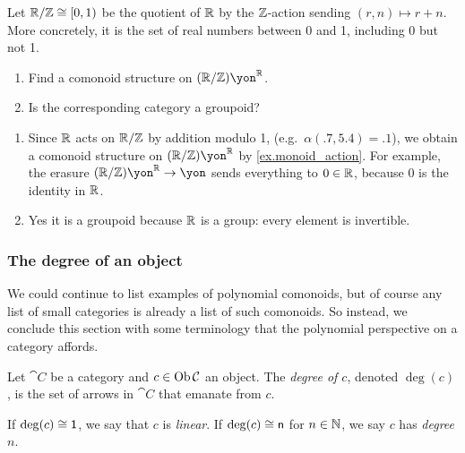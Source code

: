 \documentclass[Book-Poly]{subfiles}
\begin{document}
\begin{exercise}
Let $\mathbb{R}/\mathbb{Z}\cong[0,1)$ be the quotient of $\mathbb{R}$ by the $\mathbb{Z}$-action sending $(r,n)\mapsto r+n$.
More concretely, it is the set of real numbers between 0 and 1, including 0 but not 1.
\begin{enumerate}
	\item Find a comonoid structure on $(\rr/\zz)\yon^\rr$.
	\item Is the corresponding category a groupoid?
\qedhere
\end{enumerate}
\begin{solution}
\begin{enumerate}
    \item Since $\mathbb{R}$ acts on $\mathbb{R}/\mathbb{Z}$ by addition modulo 1, (e.g.\ $\alpha(.7,5.4)=.1$), we obtain a comonoid structure on $(\rr/\zz)\yon^\rr$ by \cref{ex.monoid_action}. For example, the erasure $(\rr/\zz)\yon^\rr\to\yon$ sends everything to $0\in\mathbb{R}$, because $0$ is the identity in $\mathbb{R}$.
    \item Yes it is a groupoid because $\mathbb{R}$ is a group: every element is invertible.
\end{enumerate}
\end{solution}
\end{exercise}


\subsubsection{The degree of an object}

We could continue to list examples of polynomial comonoids, but of course any list of small categories is already a list of such comonoids.
So instead, we conclude this section with some terminology that the polynomial perspective on a category affords.

\begin{definition}
Let $\cat{C}$ be a category and $c\in\operatorname{Ob}\mathcal{C}$ an object. The \emph{degree of $c$}, denoted $\deg(c)$, is the set of arrows in $\cat{C}$ that emanate from $c$.

If $\deg(c)\cong\textsf{1}$, we say that $c$ is \emph{linear}.
If $\deg(c)\cong\mathsf{n}$ for $n\in\mathbb{N}$, we say $c$ has \emph{degree $n$}.
\end{definition}
\end{document}
